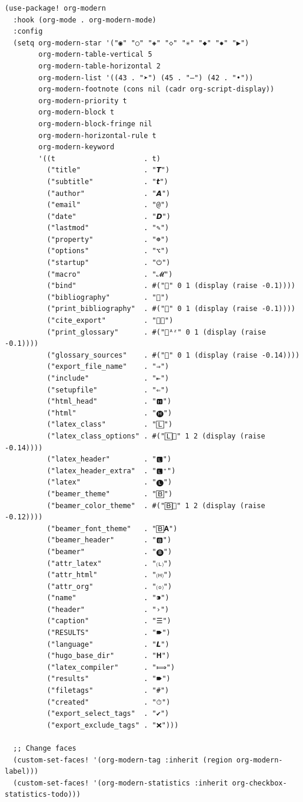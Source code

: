 \documentclass[11pt]{article}
\begin{document}
\begin{verbatim}
(use-package! org-modern
  :hook (org-mode . org-modern-mode)
  :config
  (setq org-modern-star '("◉" "○" "◈" "◇" "✳" "◆" "✸" "▶")
        org-modern-table-vertical 5
        org-modern-table-horizontal 2
        org-modern-list '((43 . "➤") (45 . "–") (42 . "•"))
        org-modern-footnote (cons nil (cadr org-script-display))
        org-modern-priority t
        org-modern-block t
        org-modern-block-fringe nil
        org-modern-horizontal-rule t
        org-modern-keyword
        '((t                     . t)
          ("title"               . "𝙏")
          ("subtitle"            . "𝙩")
          ("author"              . "𝘼")
          ("email"               . "@")
          ("date"                . "𝘿")
          ("lastmod"             . "✎")
          ("property"            . "☸")
          ("options"             . "⌥")
          ("startup"             . "⏻")
          ("macro"               . "𝓜")
          ("bind"                . #("" 0 1 (display (raise -0.1))))
          ("bibliography"        . "")
          ("print_bibliography"  . #("" 0 1 (display (raise -0.1))))
          ("cite_export"         . "⮭")
          ("print_glossary"      . #("ᴬᶻ" 0 1 (display (raise -0.1))))
          ("glossary_sources"    . #("" 0 1 (display (raise -0.14))))
          ("export_file_name"    . "⇒")
          ("include"             . "⇤")
          ("setupfile"           . "⇐")
          ("html_head"           . "🅷")
          ("html"                . "🅗")
          ("latex_class"         . "🄻")
          ("latex_class_options" . #("🄻" 1 2 (display (raise -0.14))))
          ("latex_header"        . "🅻")
          ("latex_header_extra"  . "🅻⁺")
          ("latex"               . "🅛")
          ("beamer_theme"        . "🄱")
          ("beamer_color_theme"  . #("🄱" 1 2 (display (raise -0.12))))
          ("beamer_font_theme"   . "🄱𝐀")
          ("beamer_header"       . "🅱")
          ("beamer"              . "🅑")
          ("attr_latex"          . "🄛")
          ("attr_html"           . "🄗")
          ("attr_org"            . "⒪")
          ("name"                . "⁍")
          ("header"              . "›")
          ("caption"             . "☰")
          ("RESULTS"             . "🠶")
          ("language"            . "𝙇")
          ("hugo_base_dir"       . "𝐇")
          ("latex_compiler"      . "⟾")
          ("results"             . "🠶")
          ("filetags"            . "#")
          ("created"             . "⏱")
          ("export_select_tags"  . "✔")
          ("export_exclude_tags" . "❌")))

  ;; Change faces
  (custom-set-faces! '(org-modern-tag :inherit (region org-modern-label)))
  (custom-set-faces! '(org-modern-statistics :inherit org-checkbox-statistics-todo)))
\end{verbatim}
\end{document}
